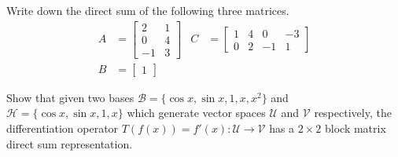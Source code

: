 \begin{Exercise}
Write down the direct sum of the following three matrices.
\begin{align*}
A &= 
\begin{bmatrix}
2 & 1 \\
0 & 4 \\
-1 & 3
\end{bmatrix} &
C &= 
\begin{bmatrix}
1 & 4 & 0 & -3 \\
0 & 2 & -1 & 1
\end{bmatrix} \\
B &= \begin{bmatrix}
1
\end{bmatrix}
\end{align*}
\end{Exercise}

\begin{Exercise}
Show that given two bases $\mathcal{B} = \{\cos x, \sin x, 1, x, x^2\}$ and $\mathcal{H} = \{\cos x, \sin x, 1, x\}$ which generate vector spaces $\mathcal{U}$ and $\mathcal{V}$ respectively, the differentiation operator $T(f(x)) = f'(x): \mathcal{U} \to \mathcal{V}$ has a $2 \times 2$ block matrix direct sum representation.
\end{Exercise}